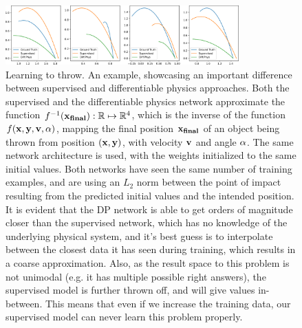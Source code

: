\begin{figure}
  \centering
  \includegraphics[width=0.8\textwidth]{figures/throwing_results}
  \caption{Learning to throw. 
    An example, showcasing an important difference between supervised and
    differentiable physics approaches. Both the supervised and the
    differentiable physics network approximate the function
    $f^{-1}(\vb{x_{final}}): \mathbb{R} \mapsto \mathbb{R}^4$, which is the
    inverse of the function $f(\vb{x}, \vb{y}, \vb{v}, \vb{\alpha})$, mapping
    the final position $\vb{x_{final}}$ of an object being thrown from position
    $(\vb{x}, \vb{y})$, with velocity $\vb{v}$ and angle $\vb{\alpha}$. The same
    network architecture is used, with the weights initialized to the same
    initial values. Both networks have seen the same number of training
    examples, and are using an $L_2$ norm between the point of impact resulting
    from the predicted initial values and the intended position. It is evident
    that the DP network is able to get orders of magnitude closer than the
    supervised network, which has no knowledge of the underlying physical
    system, and it's best guess is to interpolate between the closest data it
    has seen during training, which results in a coarse approximation. Also, as
    the result space to this problem is not unimodal (e.g. it has multiple
    possible right answers), the supervised model is further thrown off, and
    will give values in-between. This means that even if we increase the
    training data, our supervised model can never learn this problem properly.
    }   
    \label{fig:learning-to-throw}
\end{figure}
